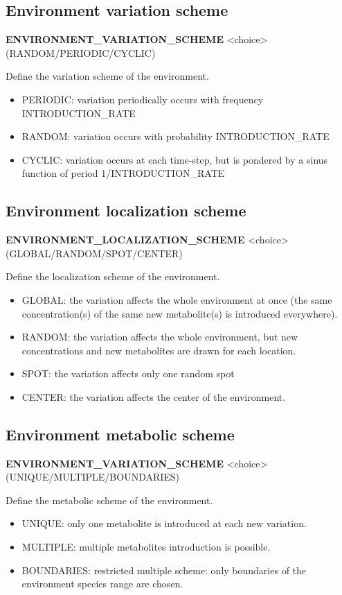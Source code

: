 \subsection{Environment variation scheme}
\begin{center}
{\bf ENVIRONMENT\_VARIATION\_SCHEME} <choice> (RANDOM/PERIODIC/CYCLIC)
\end{center}
Define the variation scheme of the environment.
\begin{itemize}
\item PERIODIC: variation periodically occurs with frequency INTRODUCTION\_RATE
\item RANDOM: variation occurs with probability INTRODUCTION\_RATE
\item CYCLIC: variation occurs at each time-step, but is pondered by a sinus function of period 1/INTRODUCTION\_RATE
\end{itemize}


\subsection{Environment localization scheme}
\begin{center}
{\bf ENVIRONMENT\_LOCALIZATION\_SCHEME} <choice> (GLOBAL/RANDOM/SPOT/CENTER)
\end{center}
Define the localization scheme of the environment.
\begin{itemize}
\item GLOBAL: the variation affects the whole environment at once (the same concentration(s) of the same new metabolite(s) is introduced everywhere).
\item RANDOM: the variation affects the whole environment, but new concentrations and new metabolites are drawn for each location.
\item SPOT: the variation affects only one random spot
\item CENTER: the variation affects the center of the environment.
\end{itemize}


\subsection{Environment metabolic scheme}
\begin{center}
{\bf ENVIRONMENT\_VARIATION\_SCHEME} <choice> (UNIQUE/MULTIPLE/BOUNDARIES)
\end{center}
Define the metabolic scheme of the environment.
\begin{itemize}
\item UNIQUE: only one metabolite is introduced at each new variation.
\item MULTIPLE: multiple metabolites introduction is possible.
\item BOUNDARIES: restricted multiple scheme: only boundaries of the environment species range are chosen.
\end{itemize}

